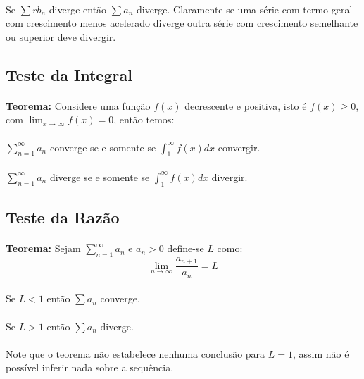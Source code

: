 \documentclass{article}
\begin{document}
        \paragraph{}Se $\sum rb_{n}$ diverge então $\sum a_{n}$ diverge. Claramente se uma série com termo geral com crescimento menos acelerado diverge outra série com crescimento semelhante ou superior deve divergir.

    \subsection{Teste da Integral}
        \paragraph{}\textbf{Teorema:} Considere uma função $f(x)$ decrescente e positiva, isto é $f(x) \ge 0$,  com $\lim_{x\to\infty}f(x)=0$, então temos:
        \paragraph{}$\sum\limits_{n=1}^{\infty}a_{n}$ converge se e somente se $\int_{1}^{\infty}f(x)dx$ convergir.
        \paragraph{}$\sum\limits_{n=1}^{\infty}a_{n}$ diverge se e somente se $\int_{1}^{\infty}f(x)dx$ divergir.
        
    \subsection{Teste da Razão}
        \paragraph{}\textbf{Teorema:} Sejam $\sum\limits_{n=1}^{\infty}a_{n}$ e $a_{n}>0$ define-se $L$ como:
            \[\lim_{n\to\infty}\frac{a_{n+1}}{a_{n}}=L\]
        \paragraph{}Se $L<1$ então $\sum a_{n}$ converge.
        \paragraph{}Se $L>1$ então $\sum a_{n}$ diverge.
        \paragraph{}Note que o teorema não estabelece nenhuma conclusão para $L=1$, assim não é possível inferir nada sobre a sequência. 
        
\end{document}
